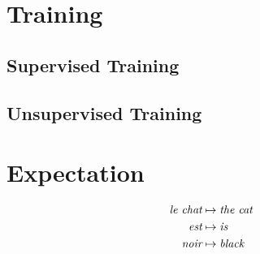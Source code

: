 \documentclass[twoside,twocolumn]{article}
\begin{document}
\section{Training}

\subsection{Supervised Training}

\subsection{Unsupervised Training}

\section{Expectation}


\begin{equation}
\centering
\begin{split}
\textit{le chat} &\mapsto \textit{the cat} \\
\textit{est} &\mapsto \textit{is} \\
\textit{noir} &\mapsto \textit{black} \\
\end{split}
\end{equation}



\end{document}
